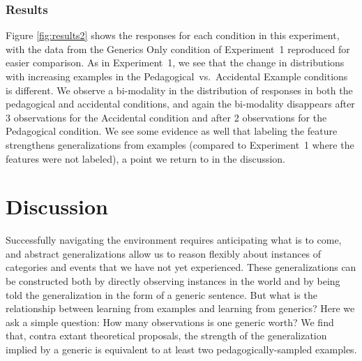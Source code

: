 \documentclass[10pt,letterpaper]{article}
\begin{document}
\subsubsection{Results}

Figure \ref{fig:results2} shows the responses for each condition in this experiment, with the data from the Generics Only condition of Experiment~1 reproduced for easier comparison. 
As in Experiment~1, we see that the change in distributions with increasing examples in the Pedagogical~vs.~Accidental Example conditions is different. We observe a bi-modality in the distribution of responses in both the pedagogical and accidental conditions, and again the bi-modality disappears after 3 observations for the Accidental condition and after 2 observations for the Pedagogical condition. We see some evidence as well that labeling the feature strengthens generalizations from examples (compared to Experiment~1 where the features were not labeled), a point we return to in the discussion.

\section{Discussion}

Successfully navigating the environment requires anticipating what is to come, and abstract generalizations allow us to reason flexibly about instances of categories and events that we have not yet experienced. 
These generalizations can be constructed both by directly observing instances in the world and by being told the generalization in the form of a generic sentence. 
But what is the relationship between learning from examples and learning from generics? 
Here we ask a simple question: How many observations is one generic worth?
We find that, contra extant theoretical proposals, the strength of the generalization implied by a generic is equivalent to at least two pedagogically-sampled examples. 
\end{document}

